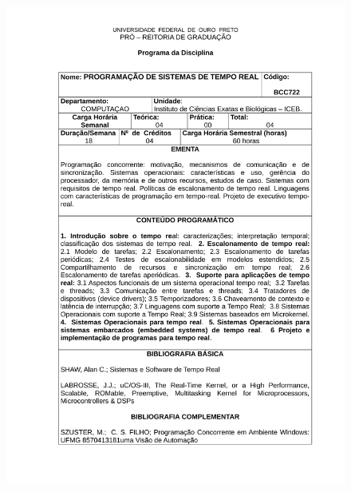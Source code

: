 \begin{figure}[p]
	\centering 
	\includegraphics[scale=0.7]{capitulos/anexo1-programas-disciplina/eg13.pdf}
\end{figure}

